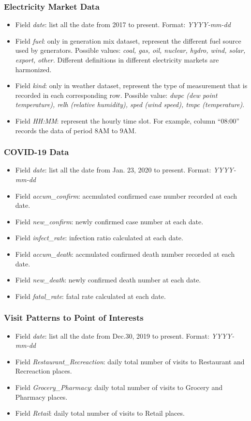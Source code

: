 \documentclass[11pt]{article}
\numberwithin{equation}{section}
\numberwithin{table}{section}
\numberwithin{figure}{section}
\begin{document}
\subsubsection{Electricity Market Data}
\begin{itemize}
	\item Field \textit{date}: list all the date from 2017 to present. Format: \textit{YYYY-mm-dd}
	\item Field \textit{fuel}: only in generation mix dataset, represent the different fuel source used by generators. Possible values: \textit{coal, gas, oil, nuclear, hydro, wind, solar, export, other.} Different definitions in different electricity markets are harmonized.
	\item Field \textit{kind}: only in weather dataset, represent the type of measurement that is recorded in each corresponding row. Possible value: \textit{dwpc (dew point temperature), relh (relative humidity), sped (wind speed), tmpc (temperature)}.
	\item Field \textit{HH:MM}: represent the hourly time slot. For example, column ``08:00'' records the data of period 8AM to 9AM.
\end{itemize}
\subsubsection{COVID-19 Data}
\begin{itemize}
	\item Field \textit{date}: list all the date from Jan. 23, 2020 to present. Format: \textit{YYYY-mm-dd}
	\item Field \textit{accum\_confirm}: accmulated confirmed case number recorded at each date.
	\item Field \textit{new\_confirm}: newly confirmed case number at each date.
	\item Field \textit{infect\_rate}: infection ratio calculated at each date.
	\item Field \textit{accum\_death}: accmulated confirmed death number recorded at each date.
	\item Field \textit{new\_death}: newly confirmed death number at each date.
	\item Field \textit{fatal\_rate}: fatal rate calculated at each date.
\end{itemize}
\subsubsection{Visit Patterns to Point of Interests}
\begin{itemize}
	\item Field \textit{date}: list all the date from Dec.30, 2019 to present. Format: \textit{YYYY-mm-dd}
	\item Field \textit{Restaurant\_Recreaction}: daily total number of visits to Restaurant and Recreaction places. 
	\item Field \textit{Grocery\_Pharmacy}: daily total number of visits to Grocery and Pharmacy places.
	\item Field \textit{Retail}: daily total number of visits to Retail places. 
\end{itemize}
\end{document}
